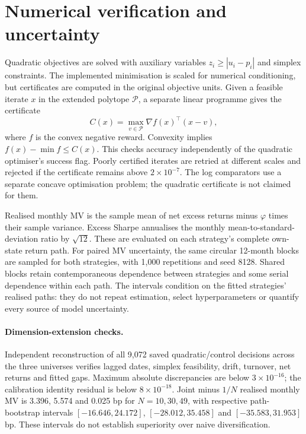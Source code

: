 \documentclass[sigconf,anonymous,review]{acmart}
\begin{document}
\section{Numerical verification and uncertainty}\label{app:verification}
Quadratic objectives are solved with auxiliary variables $z_i\ge |u_i-p_i|$ and simplex constraints. The implemented minimisation is scaled for numerical conditioning, but certificates are computed in the original objective units. Given a feasible iterate $x$ in the extended polytope $\mathcal P$, a separate linear programme gives the certificate
\begin{equation}
 C(x)=\max_{v\in\mathcal P}\nabla f(x)^\top(x-v),
\end{equation}
where $f$ is the convex negative reward. Convexity implies $f(x)-\min f\le C(x)$. This checks accuracy independently of the quadratic optimiser's success flag. Poorly certified iterates are retried at different scales and rejected if the certificate remains above $2\times10^{-7}$. The log comparators use a separate concave optimisation problem; the quadratic certificate is not claimed for them.

Realised monthly MV is the sample mean of net excess returns minus $\varphi$ times their sample variance. Excess Sharpe annualises the monthly mean-to-standard-deviation ratio by $\sqrt{12}$. These are evaluated on each strategy's complete own-state return path. For paired MV uncertainty, the same circular 12-month blocks are sampled for both strategies, with 1,000 repetitions and seed 8128. Shared blocks retain contemporaneous dependence between strategies and some serial dependence within each path. The intervals condition on the fitted strategies' realised paths: they do not repeat estimation, select hyperparameters or quantify every source of model uncertainty.


\paragraph{Dimension-extension checks.}
Independent reconstruction of all 9,072 saved quadratic/control decisions across the three universes verifies lagged dates, simplex feasibility, drift, turnover, net returns and fitted gaps. Maximum absolute discrepancies are below $3\times10^{-16}$; the calibration identity residual is below $8\times10^{-18}$. Joint minus $1/N$ realised monthly MV is 3.396, 5.574 and 0.025 bp for $N=10,30,49$, with respective path-bootstrap intervals $[-16.646,24.172]$, $[-28.012,35.458]$ and $[-35.583,31.953]$ bp. These intervals do not establish superiority over naive diversification.
\end{document}
